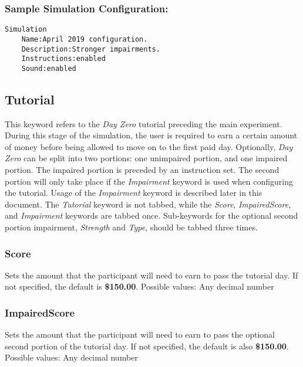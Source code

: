 \documentclass{article}
\begin{document}
\subsubsection{Sample Simulation Configuration:}
\begin{lstlisting}
Simulation
    Name:April 2019 configuration.
    Description:Stronger impairments.
    Instructions:enabled
    Sound:enabled
\end{lstlisting} 

\subsection{Tutorial}
This keyword refers to the \textit{Day Zero} tutorial preceding the main experiment. During this stage of the simulation, the user is required to earn a certain amount of money before being allowed to move on to the first paid day. Optionally, \textit{Day Zero} can be split into two portions: one unimpaired portion, and one impaired portion. The impaired portion is preceded by an instruction set. The second portion will only take place if the \textit{Impairment} keyword is used when configuring the tutorial. Usage of the \textit{Impairment} keyword is described later in this document. The \textit{Tutorial} keyword is not tabbed, while the \textit{Score}, \textit{ImpairedScore}, and \textit{Impairment} keywords are tabbed once. Sub-keywords for the optional second portion impairment, \textit{Strength} and \textit{Type}, should be tabbed three times.

\subsubsection{Score} Sets the amount that the participant will need to earn to pass the tutorial day. If not specified, the default is \textbf{\$150.00}. \newline
\indent Possible values: \newline
\indent\indent Any decimal number

\subsubsection{ImpairedScore} Sets the amount that the participant will need to earn to pass the optional second portion of the tutorial day. If not specified, the default is also \textbf{\$150.00}. \newline
\indent Possible values: \newline
\indent\indent Any decimal number
\end{document}
